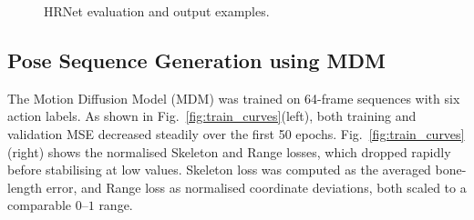 \documentclass[final-report]{report-template}
\begin{document}
\begin{figure}[H]
\caption{HRNet evaluation and output examples.}
\label{fig:two-rows-one-figure}
\end{figure}






\subsection{Pose Sequence Generation using MDM}


The Motion Diffusion Model (MDM) was trained on 64-frame sequences with six action labels. 
As shown in Fig.~\ref{fig:train_curves}(left), both training and validation MSE decreased steadily over the first 50 epochs. 
Fig.~\ref{fig:train_curves}(right) shows the normalised Skeleton and Range losses, which dropped rapidly before stabilising at low values. 
Skeleton loss was computed as the averaged bone-length error, and Range loss as normalised coordinate deviations, both scaled to a comparable $0$--$1$ range.  
\end{document}
